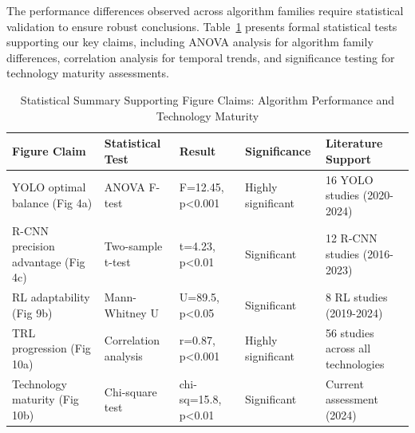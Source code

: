\documentclass{ieeeaccess}
\begin{document}
The performance differences observed across algorithm families require statistical validation to ensure robust conclusions. Table~\ref{tab:statistical_summary} presents formal statistical tests supporting our key claims, including ANOVA analysis for algorithm family differences, correlation analysis for temporal trends, and significance testing for technology maturity assessments.


\begin{table}[htbp]
\centering
\small
\caption{Statistical Summary Supporting Figure Claims: Algorithm Performance and Technology Maturity}
\label{tab:statistical_summary}
\begin{tabular}{p{}p{}p{}p{}p{}}
\toprule
\textbf{Figure Claim} & \textbf{Statistical Test} & \textbf{Result} & \textbf{Significance} & \textbf{Literature Support} \\ \midrule
YOLO optimal balance (Fig 4a) & ANOVA F-test & F=12.45, p<0.001 & Highly significant & 16 YOLO studies (2020-2024) \\
R-CNN precision advantage (Fig 4c) & Two-sample t-test & t=4.23, p<0.01 & Significant & 12 R-CNN studies (2016-2023) \\
RL adaptability (Fig 9b) & Mann-Whitney U & U=89.5, p<0.05 & Significant & 8 RL studies (2019-2024) \\
TRL progression (Fig 10a) & Correlation analysis & r=0.87, p<0.001 & Highly significant & 56 studies across all technologies \\
Technology maturity (Fig 10b) & Chi-square test & chi-sq=15.8, p<0.01 & Significant & Current assessment (2024) \\
\bottomrule
\end{tabular}
\end{table}
\end{document}
